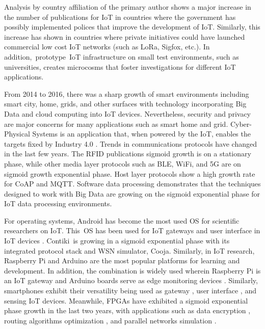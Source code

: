 \documentclass[symmetry,article,accept,moreauthors,pdftex10pt,a4paper]{mdpi}
\begin{document}
Analysis by country affiliation of the primary author shows a major increase in the number of publications for IoT in countries where the government has possibly implemented polices that improve the development of IoT. Similarly, this increase has shown in countries where private initiatives could have launched commercial low cost IoT networks (such as LoRa, Sigfox, etc.). In addition,~prototype~IoT infrastructure on small test environments, such as universities, creates microcosms that foster investigations for different IoT applications. 

From 2014 to 2016, there was a sharp growth of smart environments including smart city, home, grids, and other surfaces with technology incorporating Big Data and cloud computing into IoT devices. Nevertheless, security \cite{UlRehman2016,Alohali2014115,Peter2017} and privacy  \cite{Beligianni2016,Winter201545,Dalipi201663} are major concerns for many applications such as smart home and grid. Cyber-Physical Systems is an application that, when powered by the IoT, enables the targets fixed by Industry 4.0 \cite{Zhou2016167}. Trends in communications protocols have changed in the last few years. The RFID publications sigmoid growth is on a stationary phase, while other media layer protocols such as BLE, WiFi, and 5G are on sigmoid growth exponential phase. Host layer protocols show a high growth rate for CoAP and MQTT. Software data processing demonstrates that the techniques designed to work with Big Data are growing on the sigmoid exponential phase for IoT data processing environments.  

For operating systems, Android has become the most used OS for scientific researchers on IoT. This~OS has been used for IoT gateways \cite{Chen2015218,Bian2011526,Carlson2013619,Garcia201654} and user interface in IoT devices \cite{Mayer201446,Lee20163777}. Contiki~is growing in a sigmoid exponential phase with its integrated protocol stack and WSN simulator, Cooja. Similarly, in IoT research, Raspberry Pi and Arduino are the most popular platforms for learning and development. In addition, the combination is widely used wherein Raspberry Pi is an IoT gateway \cite{Suresh201517163,Kim20171533,Gloria2017568} and Arduino boards serve as edge monitoring devices \cite{Amin201543663,Fuertes201658,Ashwini20164311}. Similarly, smartphones exhibit their versatility being used as gateway  \cite{Seol2015133,Gupta2016416,Pereira2016}, user interface \cite{Mayer201446,Lee20163777}, and sensing \cite{Behringer2016179,Kothandaraman2016661} IoT devices. Meanwhile, FPGAs have exhibited a sigmoid exponential phase growth in the last two years, with applications such as data encryption \cite{Prasetyo201475,Rao20152212,Prathiba2016}, routing algorithms optimization \cite{Qu2012124}, and parallel networks simulation \cite{Wehner2014}. 
\end{document}

